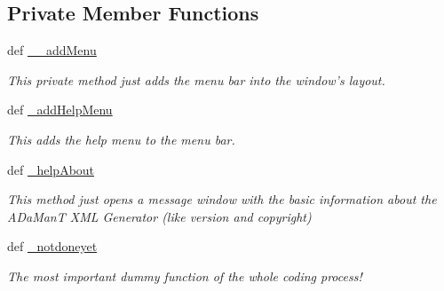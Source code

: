 \subsection*{\-Private \-Member \-Functions}
\begin{DoxyCompactItemize}
\item 
\hypertarget{classgui_1_1window2_1_1blankWindow_abdb15af3bddb428242b5299b2086846f}{def \hyperlink{classgui_1_1window2_1_1blankWindow_abdb15af3bddb428242b5299b2086846f}{\-\_\-\-\_\-add\-Menu}}\label{classgui_1_1window2_1_1blankWindow_abdb15af3bddb428242b5299b2086846f}

\begin{DoxyCompactList}\small\item\em \-This private method just adds the menu bar into the window's layout. \end{DoxyCompactList}\item 
\hypertarget{classgui_1_1window2_1_1blankWindow_a67ef40998197523b8ce51ec49aa57b94}{def \hyperlink{classgui_1_1window2_1_1blankWindow_a67ef40998197523b8ce51ec49aa57b94}{\-\_\-add\-Help\-Menu}}\label{classgui_1_1window2_1_1blankWindow_a67ef40998197523b8ce51ec49aa57b94}

\begin{DoxyCompactList}\small\item\em \-This adds the help menu to the menu bar. \end{DoxyCompactList}\item 
\hypertarget{classgui_1_1window2_1_1blankWindow_a4ee1d61778a5f333181141deb7331ea7}{def \hyperlink{classgui_1_1window2_1_1blankWindow_a4ee1d61778a5f333181141deb7331ea7}{\-\_\-help\-About}}\label{classgui_1_1window2_1_1blankWindow_a4ee1d61778a5f333181141deb7331ea7}

\begin{DoxyCompactList}\small\item\em \-This method just opens a message window with the basic information about the \-A\-Da\-Man\-T \-X\-M\-L \-Generator (like version and copyright) \end{DoxyCompactList}\item 
\hypertarget{classgui_1_1window2_1_1blankWindow_ad51169b5913ff8b94876194ea8aae18e}{def \hyperlink{classgui_1_1window2_1_1blankWindow_ad51169b5913ff8b94876194ea8aae18e}{\-\_\-notdoneyet}}\label{classgui_1_1window2_1_1blankWindow_ad51169b5913ff8b94876194ea8aae18e}

\begin{DoxyCompactList}\small\item\em \-The most important dummy function of the whole coding process! \end{DoxyCompactList}\end{DoxyCompactItemize}


